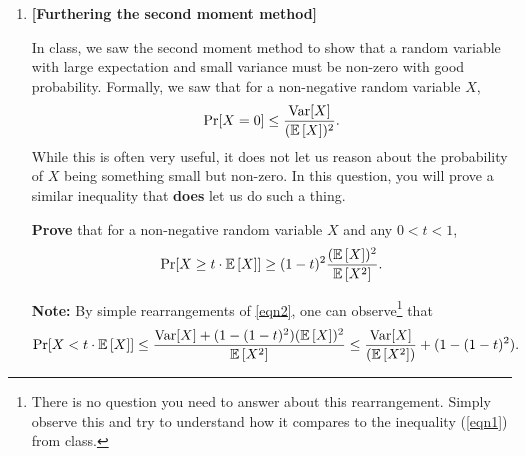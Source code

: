 \begin{enumerate}


\item {} \textbf{[Furthering the second moment method]}

In class, we saw the second moment method to show that a random variable with large expectation and small variance must be non-zero with good probability. Formally, we saw that for a non-negative random variable $X$, 
\begin{align}
\label{eqn1}
\Pr[X = 0] \leq \frac{\textrm{Var}[X]}{(\operatorname*{\mathbb{E}}\left[X\right])^2}.
\end{align}
While this is often very useful, it does not let us reason about the probability of $X$ being something small but non-zero. In this question, you will prove a similar inequality that \textbf{does} let us do such a thing. 

\textbf{Prove} that for a non-negative random variable $X$ and any $0 < t < 1$,
\begin{align}
\label{eqn2}
\Pr[X \geq t \cdot \operatorname*{\mathbb{E}}\left[X\right]] \geq (1-t)^2\frac{(\operatorname*{\mathbb{E}}\left[X\right])^2}{\operatorname*{\mathbb{E}}\left[X^2\right]}.
\end{align}


\textbf{Note:} By simple rearrangements of \eqref{eqn2}, one can observe\footnote{There is no question you need to answer about this rearrangement. Simply observe this and try to understand how it compares to the inequality (\ref{eqn1}) from class.} that
\begin{align}
\label{eqn3}
\Pr[X < t \cdot \operatorname*{\mathbb{E}}\left[X\right]] \leq \frac{\textrm{Var}[X] + (1-(1-t)^2)(\operatorname*{\mathbb{E}}\left[X\right])^2}{\operatorname*{\mathbb{E}}\left[X^2\right]} \leq \frac{\textrm{Var}[X]}{(\operatorname*{\mathbb{E}}\left[X^2\right])} +  (1-(1-t)^2).
\end{align}

\ifdefined\template
{}
\end{enumerate}
